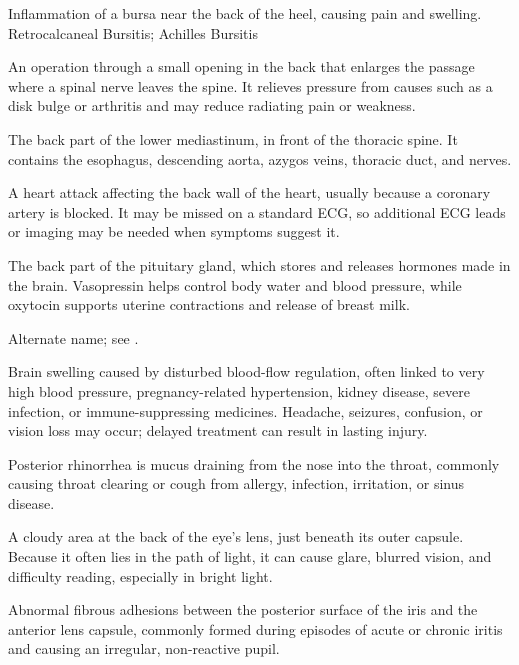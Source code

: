  Inflammation of a bursa near the back of the heel, causing pain and swelling.
\synonyms
Retrocalcaneal Bursitis; Achilles Bursitis

 An operation through a small opening in the back that enlarges the passage where a spinal nerve leaves the spine. It relieves pressure from causes such as a disk bulge or arthritis and may reduce radiating pain or weakness.

 The back part of the lower mediastinum, in front of the thoracic spine. It contains the esophagus, descending aorta, azygos veins, thoracic duct, and nerves.

 A heart attack affecting the back wall of the heart, usually because a coronary artery is blocked. It may be missed on a standard ECG, so additional ECG leads or imaging may be needed when symptoms suggest it.

 The back part of the pituitary gland, which stores and releases hormones made in the brain. Vasopressin helps control body water and blood pressure, while oxytocin supports uterine contractions and release of breast milk.

 Alternate name; see .

 Brain swelling caused by disturbed blood-flow regulation, often linked to very high blood pressure, pregnancy-related hypertension, kidney disease, severe infection, or immune-suppressing medicines. Headache, seizures, confusion, or vision loss may occur; delayed treatment can result in lasting injury.

 Posterior rhinorrhea is mucus draining from the nose into the throat, commonly causing throat clearing or cough from allergy, infection, irritation, or sinus disease.

 A cloudy area at the back of the eye’s lens, just beneath its outer capsule. Because it often lies in the path of light, it can cause glare, blurred vision, and difficulty reading, especially in bright light.

 Abnormal fibrous adhesions between the posterior surface of the iris and the anterior lens capsule, commonly formed during episodes of acute or chronic iritis and causing an irregular, non-reactive pupil.

